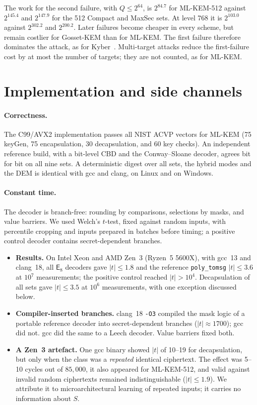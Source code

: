 \documentclass[11pt,a4paper]{article}
\theoremstyle{definition}
\theoremstyle{remark}
\newcommand{\E}{\mathsf{E}_8}
\begin{document}
The work for the second failure, with $Q\le2^{64}$, is $2^{84.7}$ for ML-KEM-512 against $2^{145.4}$ and $2^{147.9}$ for the 512 Compact and MaxSec sets. At level 768 it is $2^{103.0}$ against $2^{302.2}$ and $2^{200.2}$. Later failures become cheaper in every scheme, but remain costlier for Gosset-KEM than for ML-KEM. The first failure therefore dominates the attack, as for Kyber~\cite{danvers20}. Multi-target attacks reduce the first-failure cost by at most the number of targets; they are not counted, as for ML-KEM.

\section{Implementation and side channels}\label{sec:impl}

\paragraph{Correctness.} The C99/AVX2 implementation passes all NIST ACVP vectors for ML-KEM (75 keyGen, 75 encapsulation, 30 decapsulation, and 60 key checks). An independent reference build, with a bit-level CBD and the Conway--Sloane decoder, agrees bit for bit on all nine sets. A deterministic digest over all sets, the hybrid modes and the DEM is identical with gcc and clang, on Linux and on Windows.

\paragraph{Constant time.} The decoder is branch-free: rounding by comparisons, selections by masks, and value barriers. We used Welch's $t$-test, fixed against random inputs, with percentile cropping and inputs prepared in batches before timing; a positive control decoder contains secret-dependent branches.
\begin{itemize}[leftmargin=*,itemsep=1pt]
\item \textbf{Results.} On Intel Xeon and AMD Zen~3 (Ryzen~5 5600X), with gcc~13 and clang~18, all $\E$ decoders gave $|t|\le1.8$ and the reference \texttt{poly\_tomsg} $|t|\le3.6$ at $10^7$ measurements; the positive control reached $|t|>10^4$. Decapsulation of all sets gave $|t|\le3.5$ at $10^6$ measurements, with one exception discussed below.
\item \textbf{Compiler-inserted branches.} clang~18 \texttt{-O3} compiled the mask logic of a portable reference decoder into secret-dependent branches ($|t|\approx1700$); gcc did not. gcc did the same to a Leech decoder. Value barriers fixed both.
\item \textbf{A Zen~3 artefact.} One gcc binary showed $|t|$ of 10--19 for decapsulation, but only when the class was a \emph{repeated} identical ciphertext. The effect was 5--10 cycles out of $85{,}000$, it also appeared for ML-KEM-512, and valid against invalid random ciphertexts remained indistinguishable ($|t|\le1.9$). We attribute it to microarchitectural learning of repeated inputs; it carries no information about $S$.
\end{itemize}
\end{document}
